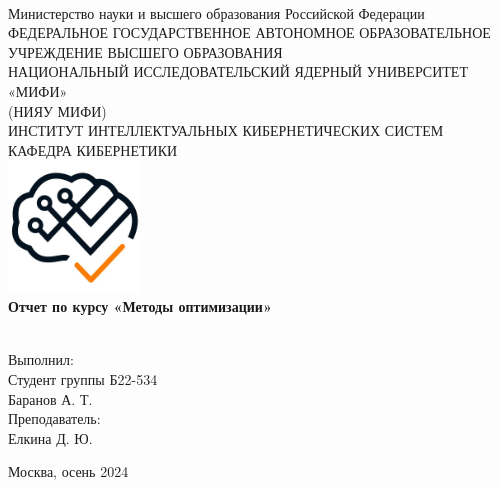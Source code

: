 \begin{titlepage}
        \newcommand{\colorRule}[3][black]{\textcolor[HTML]{#1}{\rule{#2}{#3}}}
  \begin{flushleft}
    \noindent
    \\[-1em]
    \color[HTML]{000000}
    \makebox[0pt][l]{\colorRule[435488]{1.3\textwidth}{-1pt}}
    \par
    \noindent

        {
      \begin{center}
        Министерство науки и высшего образования Российской Федерации\\
        \hfill \break
        ФЕДЕРАЛЬНОЕ ГОСУДАРСТВЕННОЕ АВТОНОМНОЕ ОБРАЗОВАТЕЛЬНОЕ \\ УЧРЕЖДЕНИЕ ВЫСШЕГО ОБРАЗОВАНИЯ \\
        НАЦИОНАЛЬНЫЙ ИССЛЕДОВАТЕЛЬСКИЙ ЯДЕРНЫЙ УНИВЕРСИТЕТ «МИФИ» \\ (НИЯУ МИФИ) \\
        
        \hfill \break
        ИНСТИТУТ ИНТЕЛЛЕКТУАЛЬНЫХ КИБЕРНЕТИЧЕСКИХ СИСТЕМ \\
        КАФЕДРА КИБЕРНЕТИКИ \\
        \vspace{1cm}
              \noindent
      \includegraphics[width=35mm, center]{../assets/title-page/logo.jpeg}\\
              \vspace{1cm}
        \huge{\textbf{Отчет по курсу «Методы оптимизации»}} \\
        \hfill \break
        \\
      \end{center}
        
      \vspace{2cm}
        
      \begin{flushright}
      Выполнил:\\
      Студент группы Б22-534\\
      \textsf{Баранов А. Т.}\\
      Преподаватель:\\
      Елкина Д. Ю.\\
      \end{flushright}
        
      \vfill
      
      
      \begin{center} Москва, \textsf{осень 2024} \end{center}
      
      \thispagestyle{empty}
      \newpage
      }
    
  \end{flushleft}
\end{titlepage}
\restoregeometry
{}

